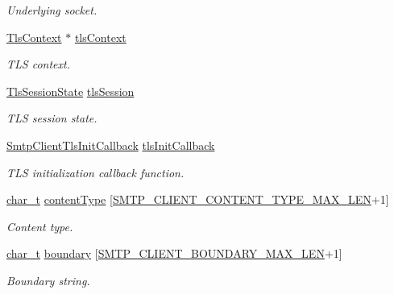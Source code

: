 \begin{DoxyCompactItemize}
\begin{DoxyCompactList}\small\item\em Underlying socket. \end{DoxyCompactList}\item 
\hyperlink{tls_8h_ac09f7a286c0cdf9b07ee1edd107946f5}{Tls\+Context} $\ast$ \hyperlink{struct__SmtpClientContext_aae64372affcfaf16b344c50487ff568f}{tls\+Context}
\begin{DoxyCompactList}\small\item\em T\+LS context. \end{DoxyCompactList}\item 
\hyperlink{structTlsSessionState}{Tls\+Session\+State} \hyperlink{struct__SmtpClientContext_abfbeefc026c246debf9ed6520f120c48}{tls\+Session}
\begin{DoxyCompactList}\small\item\em T\+LS session state. \end{DoxyCompactList}\item 
\hyperlink{smtp__client_8h_ad04a65acf644c29932a9a90545eb2291}{Smtp\+Client\+Tls\+Init\+Callback} \hyperlink{struct__SmtpClientContext_abccb1317b52843832881cafbc3321e3c}{tls\+Init\+Callback}
\begin{DoxyCompactList}\small\item\em T\+LS initialization callback function. \end{DoxyCompactList}\item 
\hyperlink{compiler__port_8h_a40bb5262bf908c328fbcfbe5d29d0201}{char\+\_\+t} \hyperlink{struct__SmtpClientContext_adcd96e07f999a41b6f39520bb7a1a4a8}{content\+Type} \mbox{[}\hyperlink{smtp__client_8h_a85f89a4d69250996b210dd7773d50479}{S\+M\+T\+P\+\_\+\+C\+L\+I\+E\+N\+T\+\_\+\+C\+O\+N\+T\+E\+N\+T\+\_\+\+T\+Y\+P\+E\+\_\+\+M\+A\+X\+\_\+\+L\+EN}+1\mbox{]}
\begin{DoxyCompactList}\small\item\em Content type. \end{DoxyCompactList}\item 
\hyperlink{compiler__port_8h_a40bb5262bf908c328fbcfbe5d29d0201}{char\+\_\+t} \hyperlink{struct__SmtpClientContext_ac5d4f45c1fbfc6f882f0d1bd99f5faa0}{boundary} \mbox{[}\hyperlink{smtp__client_8h_adea07fb5e3cabd59c58567657e9de718}{S\+M\+T\+P\+\_\+\+C\+L\+I\+E\+N\+T\+\_\+\+B\+O\+U\+N\+D\+A\+R\+Y\+\_\+\+M\+A\+X\+\_\+\+L\+EN}+1\mbox{]}
\begin{DoxyCompactList}\small\item\em Boundary string. \end{DoxyCompactList}\item 

\end{DoxyCompactItemize}
